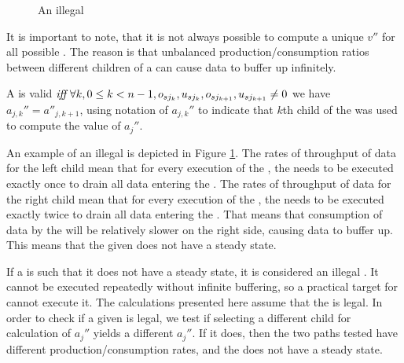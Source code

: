 \begin{figure}\begin{center}
\begin{minipage}{1in}
\centering {}
\end{minipage}
\end{center}
\caption{An illegal {\splitjoin}} \label{fig:splitjoin-illegal}
\end{figure}

It is important to note, that it is not always possible to compute
a unique $v''$ for all possible {\splitjoins}. The reason is that
unbalanced production/consumption ratios between different
children of a {\splitjoin} can cause data to buffer up infinitely.

\begin{definition} A {\splitjoin} is valid
$\emph{iff}\ \forall k, 0 \le k < n-1, o_{sj_k}, u_{sj_k},
o_{sj_{k+1}}, u_{sj_{k+1}} \ne 0$ we have $a_{j,k}'' =
a''_{j,k+1}$, using notation of $a_{j,k}''$ to indicate that $k$th
child of the {\splitjoin} was used to compute the value of
$a_j''$.
\end{definition}

An example of an illegal {\splitjoin} is depicted in Figure
\ref{fig:splitjoin-illegal}.  The rates of throughput of data for
the left child mean that for every execution of the {\splitter},
the {\joiner} needs to be executed exactly once to drain all data
entering the {\splitjoin}.  The rates of throughput of data for
the right child mean that for every execution of the {\splitter},
the {\joiner} needs to be executed exactly twice to drain all data
entering the {\splitjoin}. That means that consumption of data by
the {\joiner} will be relatively slower on the right side, causing
data to buffer up. This means that the given {\splitjoin} does not
have a steady state.

If a {\splitjoin} is such that it does not have a steady state, it
is considered an illegal {\splitjoin}.  It cannot be executed
repeatedly without infinite buffering, so a practical target for
{\StreamIt} cannot execute it.  The calculations presented here
assume that the {\splitjoin} is legal.  In order to check if a
given {\splitjoin} is legal, we test if selecting a different
child for calculation of $a_j''$ yields a different $a_j''$. If it
does, then the two paths tested have different
production/consumption rates, and the {\splitjoin} does not have a
steady state.

\subsection{\feedbackloop}

